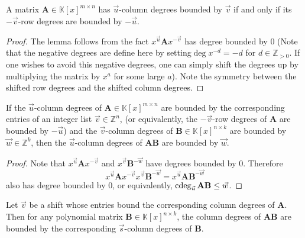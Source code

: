 \begin{lem}
\label{lem:columnDegreesRowDegreesSymmetry}A matrix $\mathbf{A}\in\mathbb{K}\left[x\right]^{m\times n}$
has $\vec{u}$-column degrees bounded by $\vec{v}$ if and only if
its $-\vec{v}$-row degrees are bounded by $-\vec{u}$. %
\begin{comment}
In addition, for a matrix $\mathbf{A}$ with $\vec{u}$-column degrees
$\vec{v}$, it has a full-rank leading $\vec{u}$-column coefficient
matrix if and only if it has a full-rank leading $-\vec{v}$-row coefficient
matrix.
\end{comment}
\end{lem}
\begin{proof}
The lemma follows from the fact $x^{\vec{u}}\mathbf{A}x^{-\vec{v}}$
has degree bounded by 0 (Note that the negative degrees are define
here by setting$\deg x^{-d}=-d$ for $d\in\mathbb{Z}_{>0}$. If one
wishes to avoid this negative degrees, one can simply shift the degrees
up by multiplying the matrix by $x^{a}$ for some large $a$). Note
the symmetry between the shifted row degrees and the shifted column
degrees.\end{proof}
\begin{lem}
\label{lem:productDegreeBound}If the $\vec{u}$-column degrees of
$\mathbf{A}\in\mathbb{K}\left[x\right]^{m\times n}$ are bounded by
the corresponding entries of an integer list $\vec{v}\in\mathbb{Z}^{n}$,
(or equivalently, the $-\vec{v}$-row degrees of $\mathbf{A}$ are
bounded by $-\vec{u}$) and the $\vec{v}$-column degrees of $\mathbf{B}\in\mathbb{K}\left[x\right]^{n\times k}$
are bounded by $\vec{w}\in\mathbb{Z}^{k}$, then the $\vec{u}$-column
degrees of $\mathbf{A}\mathbf{B}$ are bounded by $\vec{w}$. \end{lem}
\begin{proof}
Note that $x^{\vec{u}}\mathbf{A}x^{-\vec{v}}$ and $x^{\vec{v}}\mathbf{B}^{-\vec{w}}$
have degrees bounded by 0. Therefore 
\[
x^{\vec{u}}\mathbf{A}x^{-\vec{v}}x^{\vec{v}}\mathbf{B}^{-\vec{w}}=x^{\vec{u}}\mathbf{A}\mathbf{B}^{-\vec{w}}
\]
 also has degree bounded by 0, or equivalently, $\cdeg_{\vec{u}}\mathbf{A}\mathbf{B}\le\vec{w}$. \end{proof}
\begin{cor}
\label{lem:boundOnDegreesOfFA}Let $\vec{v}$ be a shift whose entries
bound the corresponding column degrees of $\mathbf{A}$. Then for
any polynomial matrix $\mathbf{B}\in\mathbb{K}\left[x\right]^{n\times k}$,
the column degrees of $\mathbf{A}\mathbf{B}$ are bounded %
by the corresponding $\vec{s}$-column degrees of $\mathbf{B}$.\end{cor}
